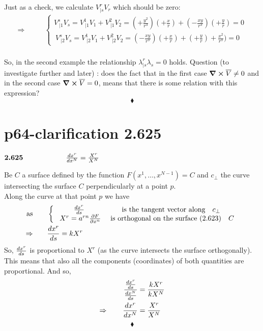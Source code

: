Just as a check, we calculate $V^r_{|s}V_r$ which should be zero:
\begin{align}
\Rightarrow \quad\quad &\left \{ \begin{array}{c}V^s_{\ |1}V_s = V^1_{\ |1}V_1+V^2_{\ |1}V_2 = (+\frac{y^2}{r^3})(+\frac{x}{r})+ (-\frac{xy}{r^3})(+\frac{y}{r}) =0\\
\ V^s_{\ |2}V_s = V^1_{\ |2}V_1+V^2_{\ |2}V_2 = (-\frac{xy}{r^3})(+\frac{x}{r})+ (+\frac{y}{r})+\frac{x^2}{r^3}) = 0
\end{array} \right.
\end{align}\\
So, in the second example the relationship $\lambda^r_{|s}\lambda_s = 0$ holds.
Question (to investigate further and later) : does the fact that in the first case $\grad \boldsymbol{\times} \overline{V}  \ne 0$ and in the second case $\grad \boldsymbol{\times} \overline{V}= 0$, means that there is some relation with this expression?
$$\blacklozenge$$
\newpage

\section{p64-clarification 2.625}
\begin{tcolorbox}
$\textbf{2.625} \quad\quad\quad\quad\quad\quad \dv{ x^r}{x^N} = \frac{X^r}{X^N}$
\end{tcolorbox}
Be $C$ a surface defined by the function $F(x^1,\dots, x^{N-1}) = C$ and  $c_{\perp}$ the curve intersecting the surface $C$ perpendicularly at a point $p$.\\
Along the curve at that point $p$ we have
\begin{align}
\text{as}\quad\quad & \left \{ \begin{array}{cc}
\dv{ x^r}{s}& \text{is the tangent vector along}\quad c_{\perp}\\
\ X^r = a^{rn}\pdv{F}{x^n}& \text{ is orthogonal on the surface (2.623)}\quad C\\
\end{array}\right.\\
\Rightarrow \quad\quad & \dv{ x^r}{s} = kX^r
\end{align}
So, $\dv{ x^r}{s}$ is proportional to $X^r$ (as the curve intersects the surface orthogonally). This means that also all the components (coordinates) of both quantities are proportional. And so,
\begin{align}
\frac{\dv{ x^r}{s}}{\dv{ x^N}{s}} &= \frac{kX^r}{kX^N}\\
\Rightarrow\quad\quad \dv{ x^r}{x^N} &= \frac{X^r}{X^N}
\end{align}
$$\blacklozenge$$
\newpage

